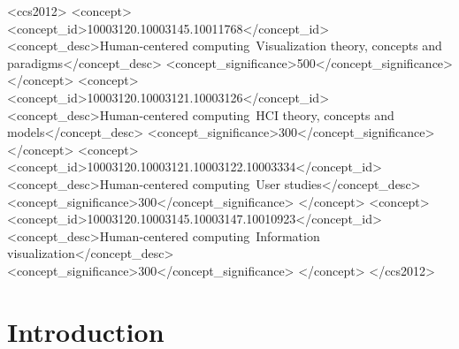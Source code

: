 \documentclass[manuscript,screen,review]{acmart}
\begin{document}
\begin{abstract}
  
\end{abstract}


\begin{CCSXML}
	<ccs2012>
	<concept>
	<concept_id>10003120.10003145.10011768</concept_id>
	<concept_desc>Human-centered computing~Visualization theory, concepts and paradigms</concept_desc>
	<concept_significance>500</concept_significance>
	</concept>
	<concept>
	<concept_id>10003120.10003121.10003126</concept_id>
	<concept_desc>Human-centered computing~HCI theory, concepts and models</concept_desc>
	<concept_significance>300</concept_significance>
	</concept>
	<concept>
	<concept_id>10003120.10003121.10003122.10003334</concept_id>
	<concept_desc>Human-centered computing~User studies</concept_desc>
	<concept_significance>300</concept_significance>
	</concept>
	<concept>
	<concept_id>10003120.10003145.10003147.10010923</concept_id>
	<concept_desc>Human-centered computing~Information visualization</concept_desc>
	<concept_significance>300</concept_significance>
	</concept>
	</ccs2012>
\end{CCSXML}


\maketitle

% 
\section{Introduction}
\end{document}
